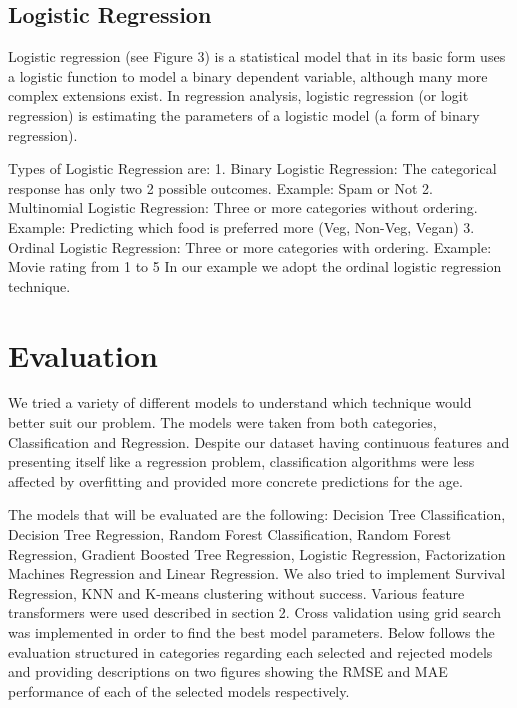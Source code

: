 \subsection{Logistic Regression}

Logistic regression (see Figure 3) is a statistical model that in its basic form uses a logistic function to model a binary dependent variable, although many more complex extensions exist. In regression analysis, logistic regression (or logit regression) is estimating the parameters of a logistic model (a form of binary regression).
 
Types of Logistic Regression are:
1. Binary Logistic Regression:
The categorical response has only two 2 possible outcomes. Example: Spam or Not
2. Multinomial Logistic Regression:
Three or more categories without ordering. Example: Predicting which food is preferred more (Veg, Non-Veg, Vegan)
3. Ordinal Logistic Regression:
Three or more categories with ordering. Example: Movie rating from 1 to 5
In our example we adopt the ordinal logistic regression technique.

\section{Evaluation}

We tried a variety of different models to understand which technique would better suit our problem. The models were taken from both categories, Classification and Regression. Despite our dataset having continuous features and presenting itself like a regression problem, classification algorithms were less affected by overfitting and provided more concrete predictions for the age.
\par The models that will be evaluated are the following: Decision Tree Classification, Decision Tree Regression, Random Forest Classification, Random Forest Regression, Gradient Boosted Tree Regression, Logistic Regression, Factorization Machines Regression and Linear Regression. We also tried to implement Survival Regression, KNN and K-means clustering without success. Various feature transformers were used described in section 2. Cross validation using grid search was implemented in order to find the best model parameters. Below follows the evaluation structured in categories regarding each selected and rejected models and providing descriptions on two figures showing the RMSE and MAE performance of each of the selected models respectively. 


